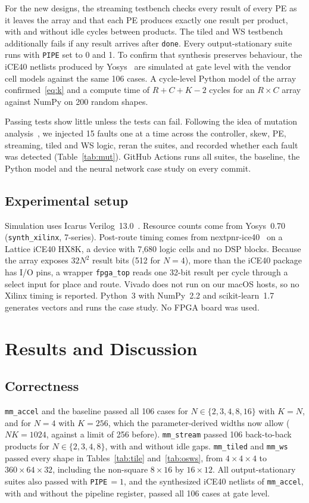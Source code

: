 \documentclass[conference]{IEEEtran}
\newcommand{\code}[1]{\texttt{#1}}
\begin{document}
For the new designs, the streaming testbench checks every result of every PE as it leaves the array and that each PE produces exactly one result per product, with and without idle cycles between products. The tiled and WS testbench additionally fails if any result arrives after \code{done}. Every output-stationary suite runs with \code{PIPE} set to 0 and 1. To confirm that synthesis preserves behaviour, the iCE40 netlists produced by Yosys~\cite{yosys} are simulated at gate level with the vendor cell models against the same 106 cases. A cycle-level Python model of the array confirmed~\eqref{eq:k} and a compute time of $R + C + K - 2$ cycles for an $R\times C$ array against NumPy on 200 random shapes.

Passing tests show little unless the tests can fail. Following the idea of mutation analysis~\cite{demillo1978}, we injected 15 faults one at a time across the controller, skew, PE, streaming, tiled and WS logic, reran the suites, and recorded whether each fault was detected (Table~\ref{tab:mut}). GitHub Actions runs all suites, the baseline, the Python model and the neural network case study on every commit.

\subsection{Experimental setup}
Simulation uses Icarus Verilog~13.0~\cite{iverilog}. Resource counts come from Yosys~0.70~\cite{yosys} (\code{synth\_xilinx}, 7-series). Post-route timing comes from nextpnr-ice40~\cite{shah2019} on a Lattice iCE40 HX8K, a device with 7,680 logic cells and no DSP blocks. Because the array exposes $32N^2$ result bits (512 for $N{=}4$), more than the iCE40 package has I/O pins, a wrapper \code{fpga\_top} reads one 32-bit result per cycle through a select input for place and route. Vivado does not run on our macOS hosts, so no Xilinx timing is reported. Python~3 with NumPy~2.2 and scikit-learn~1.7~\cite{pedregosa2011} generates vectors and runs the case study. No FPGA board was used.

\section{Results and Discussion}
\label{sec:results}

\subsection{Correctness}
\code{mm\_accel} and the baseline passed all 106 cases for $N \in \{2,3,4,8,16\}$ with $K = N$, and for $N = 4$ with $K = 256$, which the parameter-derived widths now allow ($NK = 1024$, against a limit of 256 before). \code{mm\_stream} passed 106 back-to-back products for $N \in \{2,3,4,8\}$, with and without idle gaps. \code{mm\_tiled} and \code{mm\_ws} passed every shape in Tables~\ref{tab:tile} and~\ref{tab:osws}, from $4\times4\times4$ to $360\times64\times32$, including the non-square $8\times16$ by $16\times12$. All output-stationary suites also passed with \code{PIPE}$\,=1$, and the synthesized iCE40 netlists of \code{mm\_accel}, with and without the pipeline register, passed all 106 cases at gate level.
\end{document}
